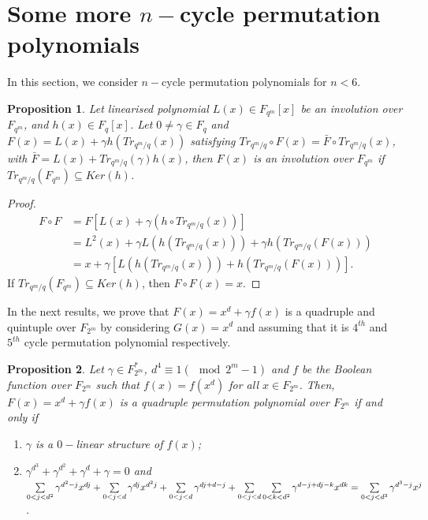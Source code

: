 \documentclass[12pt,a4paper]{article}
\newtheorem{proposition}{Proposition}[section]
\begin{document}
\section{Some more $ n-$cycle permutation polynomials}
In this section, we consider $ n-$cycle permutation polynomials for $ n<6 $. 
\begin{proposition}\label{c1}
	Let linearised polynomial $ L(x)\in F_{q^{m}}[x] $ be an involution over $ F_{q^{m}} $, and $ h(x)\in F_{q}[x] $. Let $ 0\not=\gamma\in F_{q} $ and $ F(x)=L(x)+\gamma h(Tr_{q^{m}/q}(x)) $ satisfying $ Tr_{q^{m}/q}\circ F(x)=\bar{F}\circ Tr_{q^{m}/q}(x) $, with $ \bar{F}=L(x)+Tr_{q^{m}/q}(\gamma)h(x) $, then $ F(x) $ is an involution over $ F_{q^{m}} $ if $ Tr_{q^{m}/q}(F_{q^{m}})\subseteq Ker(h) $.
\end{proposition}

\begin{proof}
	\begin{equation}
		\begin{split}
			F\circ F &=F[L(x)+\gamma (h\circ Tr_{q^{m}/q}(x))]\\
			&=L^{2}(x)+\gamma L(h(Tr_{q^{m}/q}(x)))+\gamma h(Tr_{q^{m}/q}(F(x)))\\
			&=x+\gamma[L(h(Tr_{q^{m}/q}(x)))+h(Tr_{q^{m}/q}(F(x)))].
		\end{split}
	\end{equation}
	If $ Tr_{q^{m}/q}(F_{q^{m}})\subseteq Ker(h) $, then $ F\circ F(x)=x $.
\end{proof}
In the next results, we prove that $F(x)=x^{d}+\gamma f(x)$ is a quadruple and quintuple over $ F_{2^{m}} $ by considering $ G(x)=x^{d} $ and assuming that it is $ 4^{th} $ and $ 5^{th} $ cycle permutation polynomial respectively.
\begin{proposition}\label{c2}
	Let $ \gamma\in F_{2^{m}}^{*}$, $ d^{4}\equiv1(\mod2^{m}-1) $ and $ f $ be the Boolean function over $ F_{2^{m}} $ such that $ f(x)=f(x^{d}) $ for all $ x\in F_{2^{m}} $. Then, $F(x)=x^{d}+\gamma f(x)$ is a quadruple permutation polynomial over $ F_{2^{m}} $ if and only if
	\begin{enumerate}
		\item $\gamma$ is a $0-$linear structure of $ f(x) $;
		\item $ \gamma^{d^{3}}+\gamma^{d^{2}}+\gamma^{d}+\gamma=0 $ and\\
		$ \sum\limits_{0<j<d^{2}}\gamma^{d^{2}-j}x^{dj}+\sum\limits_{0<j<d}\gamma^{dj}x^{d^{2}j} +\sum\limits_{0<j<d}\gamma^{dj+d-j}+\sum\limits_{0<j<d}\sum\limits_{0<k<d^{2}}\gamma^{d-j+dj-k}x^{dk}\\=\sum\limits_{0<j<d^{3}}\gamma^{d^{3}-j}x^{j}$.
	\end{enumerate} 
\end{proposition}
\end{document}
